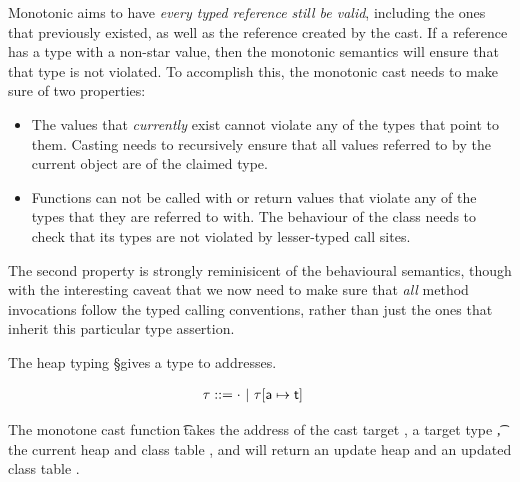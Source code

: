 \documentclass[a4paper,USenglish]{tex/lipics-v2016}
\begin{document}


Monotonic aims to have \emph{every typed reference still be valid},
including the ones that previously existed, as well as the reference created
by the cast. If a reference has a type with a non-star value, then the
monotonic semantics will ensure that that type is not violated. To
accomplish this, the monotonic cast needs to make sure of two properties:
\begin{itemize}
\item The values that \emph{currently} exist cannot violate any of the types
  that point to them. Casting needs to recursively ensure that all values
  referred to by the current object are of the claimed type.
\item Functions can not be called with or return values that violate any of
  the types that they are referred to with. The behaviour of the class needs
  to check that its types are not violated by lesser-typed call sites.
\end{itemize}
The second property is strongly reminisicent of the behavioural semantics,
though with the interesting caveat that we now need to make sure that
\emph{all} method invocations follow the typed calling conventions, rather
than just the ones that inherit this particular type assertion.


The heap typing \S gives a type to addresses.

\begin{align*}
\tau &::= \cdot ~|~  \tau[{\sf{a}} \mapsto {\sf{t}}] 
\end{align*}

The monotone cast function \moncast\a\t\s\K\Kp\sp takes the address of the
cast target \a, a target type \t, the current heap \s and class table \K, and
will return an update heap \sp and an updated class table \Kp.
\end{document}
